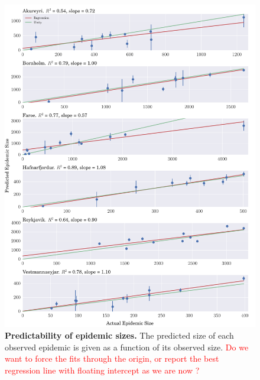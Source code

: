\documentclass[10pt]{article}
\begin{document}
\begin{figure}[!h]
\centering
\includegraphics[width=\textwidth]{figures/4_sizes.pdf}
\caption{\textbf{Predictability of epidemic sizes.} The predicted size of each observed epidemic is given as a function of its observed size. \textcolor{red}{Do we want to force the fits through the origin, or report the best regression line with floating intercept as we are now ?}}
\label{fig_sizes}
\end{figure}
\end{document}
